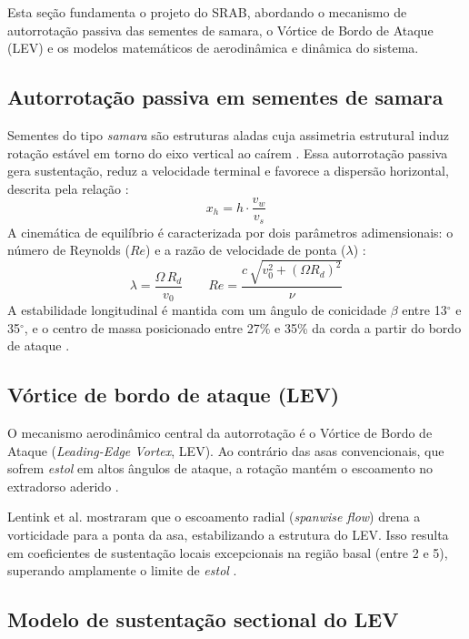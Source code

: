 Esta seção fundamenta o projeto do SRAB, abordando o mecanismo de autorrotação passiva das sementes de samara, o Vórtice de Bordo de Ataque (LEV) e os modelos matemáticos de aerodinâmica e dinâmica do sistema.

\subsection{Autorrotação passiva em sementes de samara}

Sementes do tipo \textit{samara} são estruturas aladas cuja assimetria estrutural induz rotação estável em torno do eixo vertical ao caírem \citep{limacher2015}. Essa autorrotação passiva gera sustentação, reduz a velocidade terminal e favorece a dispersão horizontal, descrita pela relação \citep{limacher2015}:
\begin{equation}
x_h = h \cdot \frac{v_w}{v_s}
\end{equation}
A cinemática de equilíbrio é caracterizada por dois parâmetros adimensionais: o número de Reynolds ($Re$) e a razão de velocidade de ponta ($\lambda$) \citep{limacher2015}:
\begin{equation}
\lambda = \frac{\Omega \, R_d}{v_0}
\qquad
Re = \frac{c\,\sqrt{v_0^2 + (\Omega R_d)^2}}{\nu}
\end{equation}
A estabilidade longitudinal é mantida com um ângulo de conicidade $\beta$ entre 13$^{\circ}$ e 35$^{\circ}$, e o centro de massa posicionado entre 27\% e 35\% da corda a partir do bordo de ataque \citep{limacher2015}.

\subsection{Vórtice de bordo de ataque (LEV)}

O mecanismo aerodinâmico central da autorrotação é o Vórtice de Bordo de Ataque (\textit{Leading-Edge Vortex}, LEV). Ao contrário das asas convencionais, que sofrem \textit{estol} em altos ângulos de ataque, a rotação mantém o escoamento no extradorso aderido \citep{lentink2009, rezgui2020}.

Lentink et al. \citeyear{lentink2009} mostraram que o escoamento radial (\textit{spanwise flow}) drena a vorticidade para a ponta da asa, estabilizando a estrutura do LEV. Isso resulta em coeficientes de sustentação locais excepcionais na região basal (entre 2 e 5), superando amplamente o limite de \textit{estol} \citep{lentink2009, mcconnell2023}.

\subsection{Modelo de sustentação sectional do LEV}

